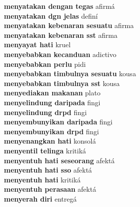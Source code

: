 \textbf{ menyatakan dengan tegas  } afirmá \\
\textbf{ menyatakan dgn jelas  } definí \\
\textbf{ menyatakan kebenaran sesuatu  } afirma \\
\textbf{ menyatakan kebenaran sst  } afirma \\
\textbf{ menyayat hati  } kruel \\
\textbf{ menyebabkan kecanduan  } adictivo \\
\textbf{ menyebabkan perlu  } pidi \\
\textbf{ menyebabkan timbulnya sesuatu  } kousa \\
\textbf{ menyebabkan timbulnya sst  } kousa \\
\textbf{ menyediakan makanan  } plato \\
\textbf{ menyelindung daripada  } fingi \\
\textbf{ menyelindung drpd  } fingi \\
\textbf{ menyembunyikan daripada  } fingi \\
\textbf{ menyembunyikan drpd  } fingi \\
\textbf{ menyenangkan hati  } konsolá \\
\textbf{ menyentil telinga  } kritiká \\
\textbf{ menyentuh hati seseorang  } afektá \\
\textbf{ menyentuh hati sso  } afektá \\
\textbf{ menyentuh hati  } kritiká \\
\textbf{ menyentuh perasaan  } afektá \\
\textbf{ menyerah diri  } entregá \\
